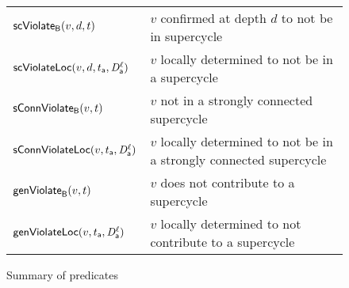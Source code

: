 \begin{figure}[t]

\begin{tabular}{|l|l|}
\hline
$\mathsf{scViolate}_{\mathsf{B}}(v,d,t)$  & $v$ confirmed at depth $d$ to not be in supercycle\\ 
$\mathsf{scViolateLoc}(v,d,t_{\mathsf{a}},\mathit{D}_{\mathsf{a}}^{\ell})$ & $v$ locally determined to not be in a supercycle\\

$\mathsf{sConnViolate}_{\mathsf{B}}(v,t)$ & $v$ not in a strongly connected supercycle \\

$\mathsf{sConnViolateLoc}(v,t_{\mathsf{a}},\mathit{D}_{\mathsf{a}}^{\ell})$ & $v$ locally determined to not be in a strongly connected supercycle \\

$\mathsf{genViolate}_{\mathsf{B}}(v,t)$ & $v$ does not contribute to a supercycle\\

$\mathsf{genViolateLoc}(v,t_{\mathsf{a}},\mathit{D}_{\mathsf{a}}^{\ell})$ & $v$ locally determined to not contribute to a supercycle\\

\hline
\end{tabular}

\caption{Summary of predicates}
\label{fig:summaryPredicates}
\end{figure}


